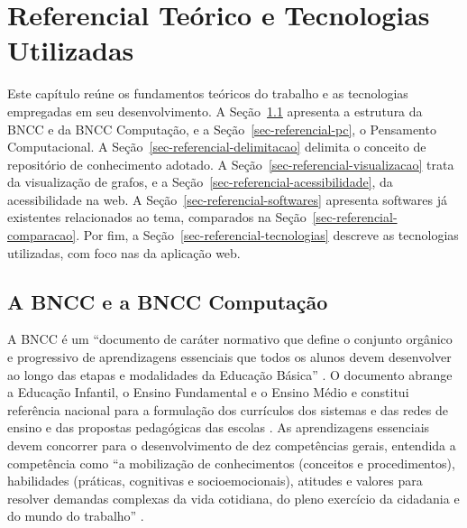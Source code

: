 \chapter{Referencial Teórico e Tecnologias Utilizadas}
\label{sec-referencial}

Este capítulo reúne os fundamentos teóricos do trabalho e as tecnologias empregadas em seu desenvolvimento. A Seção~\ref{sec-referencial-bncc} apresenta a estrutura da BNCC e da BNCC Computação, e a Seção~\ref{sec-referencial-pc}, o Pensamento Computacional. A Seção~\ref{sec-referencial-delimitacao} delimita o conceito de repositório de conhecimento adotado. A Seção~\ref{sec-referencial-visualizacao} trata da visualização de grafos, e a Seção~\ref{sec-referencial-acessibilidade}, da acessibilidade na web. A Seção~\ref{sec-referencial-softwares} apresenta softwares já existentes relacionados ao tema, comparados na Seção~\ref{sec-referencial-comparacao}. Por fim, a Seção~\ref{sec-referencial-tecnologias} descreve as tecnologias utilizadas, com foco nas da aplicação web.


\section{A BNCC e a BNCC Computação}
\label{sec-referencial-bncc}

A BNCC é um ``documento de caráter normativo que define o conjunto orgânico e progressivo de aprendizagens essenciais que todos os alunos devem desenvolver ao longo das etapas e modalidades da Educação Básica'' \cite[p.~7]{brasil2018bncc}. O documento abrange a Educação Infantil, o Ensino Fundamental e o Ensino Médio e constitui referência nacional para a formulação dos currículos dos sistemas e das redes de ensino e das propostas pedagógicas das escolas \cite[p.~8--9]{brasil2018bncc}. As aprendizagens essenciais devem concorrer para o desenvolvimento de dez competências gerais, entendida a competência como ``a mobilização de conhecimentos (conceitos e procedimentos), habilidades (práticas, cognitivas e socioemocionais), atitudes e valores para resolver demandas complexas da vida cotidiana, do pleno exercício da cidadania e do mundo do trabalho'' \cite[p.~8]{brasil2018bncc}.

